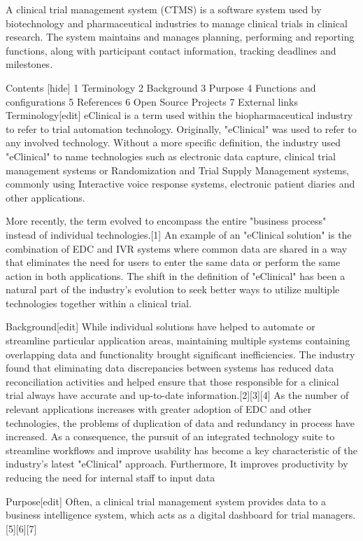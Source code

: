 A clinical trial management system (CTMS) is a software system used by biotechnology and pharmaceutical industries to manage clinical trials in clinical research. The system maintains and manages planning, performing and reporting functions, along with participant contact information, tracking deadlines and milestones.

Contents  [hide] 
1	Terminology
2	Background
3	Purpose
4	Functions and configurations
5	References
6	Open Source Projects
7	External links
Terminology[edit]
eClinical is a term used within the biopharmaceutical industry to refer to trial automation technology. Originally, "eClinical" was used to refer to any involved technology. Without a more specific definition, the industry used "eClinical" to name technologies such as electronic data capture, clinical trial management systems or Randomization and Trial Supply Management systems, commonly using Interactive voice response systems, electronic patient diaries and other applications.

More recently, the term evolved to encompass the entire "business process" instead of individual technologies.[1] An example of an "eClinical solution" is the combination of EDC and IVR systems where common data are shared in a way that eliminates the need for users to enter the same data or perform the same action in both applications. The shift in the definition of "eClinical" has been a natural part of the industry’s evolution to seek better ways to utilize multiple technologies together within a clinical trial.

Background[edit]
While individual solutions have helped to automate or streamline particular application areas, maintaining multiple systems containing overlapping data and functionality brought significant inefficiencies. The industry found that eliminating data discrepancies between systems has reduced data reconciliation activities and helped ensure that those responsible for a clinical trial always have accurate and up-to-date information.[2][3][4] As the number of relevant applications increases with greater adoption of EDC and other technologies, the problems of duplication of data and redundancy in process have increased. As a consequence, the pursuit of an integrated technology suite to streamline workflows and improve usability has become a key characteristic of the industry’s latest "eClinical" approach. Furthermore, It improves productivity by reducing the need for internal staff to input data

Purpose[edit]
Often, a clinical trial management system provides data to a business intelligence system, which acts as a digital dashboard for trial managers.[5][6][7]

